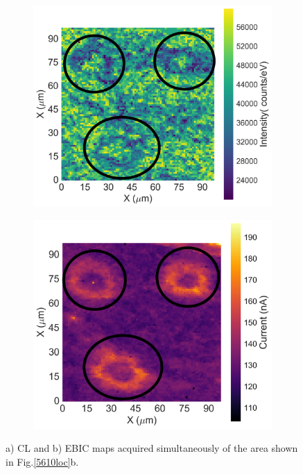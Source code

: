 \FloatBarrier

\begin{figure}[h]
	\hspace*{0.5cm}
	\begin{subfigure}[b]{0.48\textwidth}
		\centering
		\includegraphics[width=1\linewidth]{Figs/Ch3/5608AsmallCL}
		\caption{}
		
	\end{subfigure}%
	\hspace*{0.5cm}
	\begin{subfigure}[b]{0.48\textwidth}
		\centering
		\includegraphics[width=0.98\linewidth]{Figs/Ch3/5608smallEBIC}
		\caption{}
	\end{subfigure}%
	
	\caption{a) CL and b) EBIC maps acquired simultaneously of the area shown in Fig.\ref{5610loc}b.}
	\label{5608CLEBIC}
\end{figure}
\FloatBarrier


